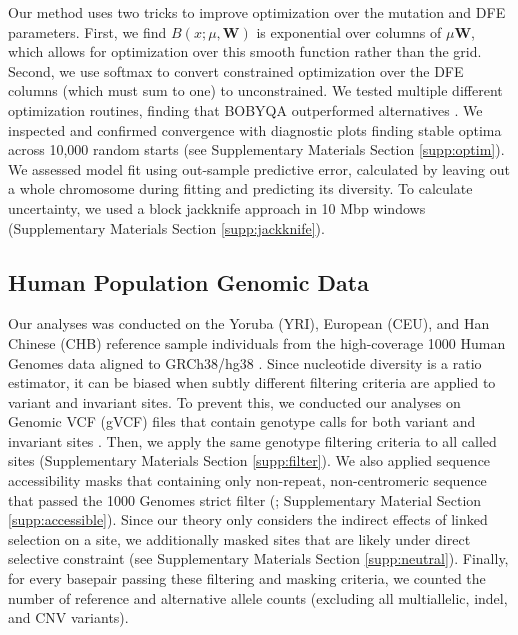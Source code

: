 \documentclass[11pt]{article}
\begin{document}
Our method uses two tricks to improve optimization over the mutation and DFE
parameters. First, we find $B(x; \mu, \mathbf{W})$ is exponential over columns
of $\mu \mathbf{W}$, which allows for optimization over this smooth function
rather than the grid. Second, we use softmax to convert constrained
optimization over the DFE columns (which must sum to one) to unconstrained. We
tested multiple different optimization routines, finding that BOBYQA
outperformed alternatives \parencite{Powell2009-jm,Johnson2007-tl}. We
inspected and confirmed convergence with diagnostic plots finding stable optima
across 10,000 random starts (see Supplementary Materials Section
\ref{supp:optim}). We assessed model fit using out-sample predictive error,
calculated by leaving out a whole chromosome during fitting and predicting its
diversity. To calculate uncertainty, we used a block jackknife approach in 10
Mbp windows (Supplementary Materials Section \ref{supp:jackknife}).

\subsection*{Human Population Genomic Data}
\label{sec:methods-data}

Our analyses was conducted on the Yoruba (YRI), European (CEU), and Han Chinese
(CHB) reference sample individuals from the high-coverage 1000 Human Genomes
data aligned to GRCh38/hg38 \parencite{Byrska-Bishop2022-tn}. Since nucleotide
diversity is a ratio estimator, it can be biased when subtly different
filtering criteria are applied to variant and invariant sites. To prevent this,
we conducted our analyses on Genomic VCF (gVCF) files that contain genotype
calls for both variant and invariant sites \parencite{Illumina_Inc2020-dk}.
Then, we apply the same genotype filtering criteria to all called sites
(Supplementary Materials Section \ref{supp:filter}). We also applied sequence
accessibility masks that containing only non-repeat, non-centromeric sequence
that passed the 1000 Genomes strict filter
(\cite{1000_Genomes_Project_Consortium2015-mi}; Supplementary Material Section
\ref{supp:accessible}). Since our theory only considers the indirect effects of
linked selection on a site, we additionally masked sites that are likely under
direct selective constraint (see Supplementary Materials Section
\ref{supp:neutral}). Finally, for every basepair passing these filtering and
masking criteria, we counted the number of reference and alternative allele
counts (excluding all multiallelic, indel, and CNV variants).
\end{document}
